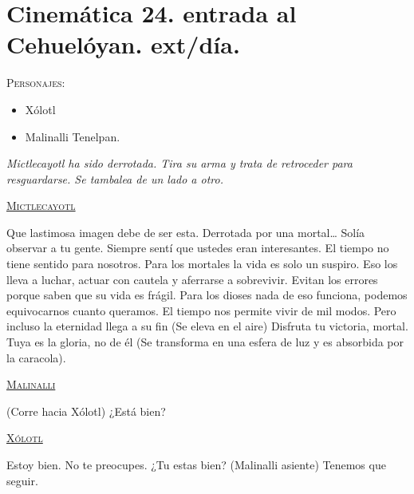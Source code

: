 \section{Cinemática 24. entrada al Cehuelóyan. ext/día.}
 \label{Cin:Cinematica24}
\textsc{Personajes}:
\begin{itemize}
\item Xólotl
\item Malinalli Tenelpan.
\end{itemize}
\textit{Mictlecayotl ha sido derrotada. Tira su arma y trata de retroceder para resguardarse. Se tambalea de un lado a otro.}
\begin{center}
\textsc{\underline{Mictlecayotl}}
\\
\par
Que lastimosa imagen debe de ser esta. Derrotada por una mortal… Solía observar a tu gente. Siempre sentí que ustedes eran interesantes. El tiempo no tiene sentido para nosotros. Para los mortales la vida es solo un suspiro. Eso los lleva a luchar, actuar con cautela y aferrarse a sobrevivir. Evitan los errores porque saben que su vida es frágil. Para los dioses nada de eso funciona, podemos equivocarnos cuanto queramos. El tiempo nos permite vivir de mil modos. Pero incluso la eternidad llega a su fin (Se eleva en el aire) Disfruta tu victoria, mortal. Tuya es la gloria, no de él (Se transforma en una esfera de luz y es absorbida por la caracola).
\\
\par
 \textsc{\underline{Malinalli}}
 \\
\par
(Corre hacia Xólotl) ¿Está bien?
\\
\par
\textsc{\underline{Xólotl}}
\\
\par
Estoy bien. No te preocupes. ¿Tu estas bien? (Malinalli asiente) Tenemos que seguir.
\end{center}
